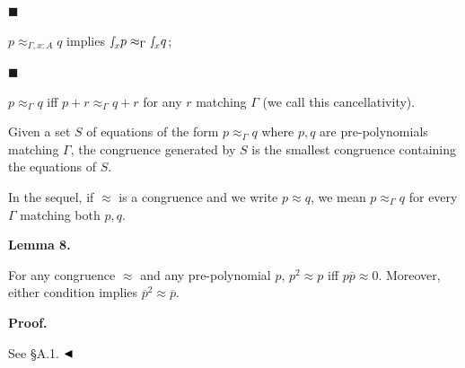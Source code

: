 \documentclass[10pt,a4paper]{amsart}
\begin{document}
 
 
\par\noindent  $\blacksquare$ 
 
$p\approx_{\Gamma,x:A}q$ implies ${\smallint\!}_{x}p\approx_{\Gamma}{\smallint\!}_{x}q$;\par
 
 
 
\par\noindent  $\blacksquare$ 
 
$p\approx_{\Gamma}q$ iff $p+r\approx_{\Gamma}q+r$ for any $r$ matching $\Gamma$ (we call this cancellativity).\par
 
 
  
Given a set $S$ of equations of the form $p\approx_{\Gamma}q$ where $p,q$ are pre-polynomials matching $\Gamma$, the congruence generated by $S$ is the smallest congruence containing the equations of $S$.\par
 
 
 
In the sequel, if $\approx$ is a congruence and we write $p\approx q$, we mean $p\approx_{\Gamma}q$ for every $\Gamma$ matching both $p,q$.\par
 
 
 
\par\medskip\noindent\textbf{Lemma 8.}\par
 
 
For any congruence $\approx$ and any pre-polynomial $p$, $p^{2}\approx p$ iff $p\overline{p}\approx 0$. Moreover, either condition implies $\overline{p}^{2}\approx\overline{p}$.\par
 
 
 
 
\par\medskip\noindent\textbf{Proof.}\par
 
 
See §A.1. $\hfill\blacktriangleleft$\par
 
\end{document}
